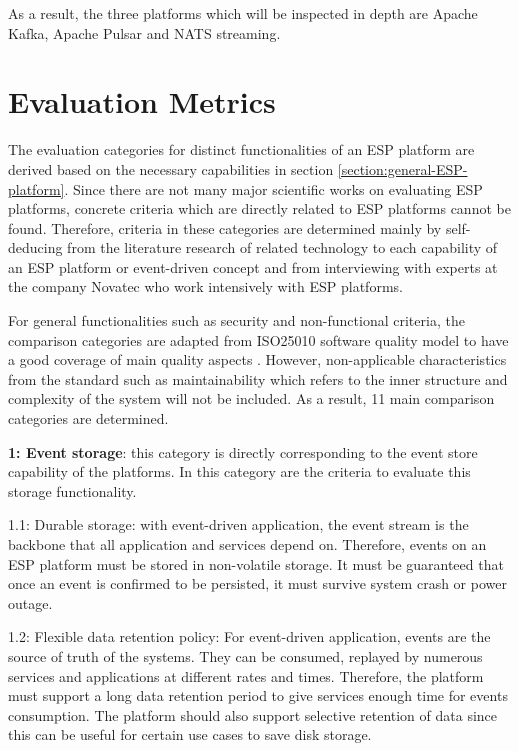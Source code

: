 As a result, the three platforms which will be inspected in depth are Apache Kafka, Apache Pulsar and NATS streaming.

\section{Evaluation Metrics} \label{section:evaluationcriteria}
The evaluation categories for distinct functionalities of an ESP platform are derived based on the necessary capabilities in section \ref{section:general-ESP-platform}. Since there are not many major scientific works on evaluating ESP platforms, concrete criteria which are directly related to ESP platforms cannot be found. Therefore, criteria in these categories are determined mainly by self-deducing from the literature research of related technology to each capability of an ESP platform or event-driven concept and from interviewing with experts at the company Novatec who work intensively with ESP platforms.

For general functionalities such as security and non-functional criteria, the comparison categories are adapted from ISO25010 software quality model to have a good coverage of main quality aspects \cite{iso25010}. However, non-applicable characteristics from the standard such as maintainability which refers to the inner structure and complexity of the system will not be included. As a result, 11 main comparison categories are determined. 


\textbf{1: Event storage}: this category is directly corresponding to the event store capability of the platforms. In this category are the criteria to evaluate this storage functionality.

1.1: Durable storage: with event-driven application, the event stream is the backbone that all application and services depend on. Therefore, events on an ESP platform must be stored in non-volatile storage. It must be guaranteed that once an event is confirmed to be persisted, it must survive system crash or power outage.

1.2: Flexible data retention policy: For event-driven application, events are the source of truth of the systems. They can be consumed, replayed by numerous services and applications at different rates and times. Therefore, the platform must support a long data retention period to give services enough time for events consumption. The platform should also support selective retention of data since this can be useful for certain use cases to save disk storage.

